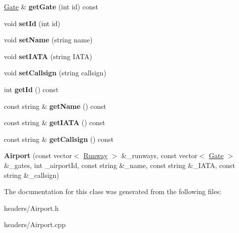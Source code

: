 \begin{DoxyCompactItemize}
\item 
\mbox{\label{class_airport_ac90a68c85cc0d7359bab8ca0d0ff8c0b}} 
\mbox{\hyperlink{class_gate}{Gate}} \& {\bfseries get\+Gate} (int id) const
\item 
\mbox{\label{class_airport_a3b8ef3abafb9f29b97acb73eb8014502}} 
void {\bfseries set\+Id} (int id)
\item 
\mbox{\label{class_airport_a064fd9435cd179b04d94c04a18a96583}} 
void {\bfseries set\+Name} (string name)
\item 
\mbox{\label{class_airport_a9555c51c003f8acb412e07442cb920c8}} 
void {\bfseries set\+I\+A\+TA} (string I\+A\+TA)
\item 
\mbox{\label{class_airport_a211a2877b1d654a9a50b28f260eec159}} 
void {\bfseries set\+Callsign} (string callsign)
\item 
\mbox{\label{class_airport_ab7f1095f9c7bf4940bd5b375fa8a5fc4}} 
int {\bfseries get\+Id} () const
\item 
\mbox{\label{class_airport_aa5be38443c1de176e52c4f5f5252c956}} 
const string \& {\bfseries get\+Name} () const
\item 
\mbox{\label{class_airport_aa127b88a8221fa23977c4fa6e37eee5b}} 
const string \& {\bfseries get\+I\+A\+TA} () const
\item 
\mbox{\label{class_airport_a7fd582a5f9554830247f724ddc031d84}} 
const string \& {\bfseries get\+Callsign} () const
\item 
\mbox{\label{class_airport_a7f47a952f374fd803abe6dca83a5755e}} 
{\bfseries Airport} (const vector$<$ \mbox{\hyperlink{class_runway}{Runway}} $>$ \&\+\_\+runways, const vector$<$ \mbox{\hyperlink{class_gate}{Gate}} $>$ \&\+\_\+gates, int \+\_\+airport\+Id, const string \&\+\_\+name, const string \&\+\_\+\+I\+A\+TA, const string \&\+\_\+callsign)
\end{DoxyCompactItemize}


The documentation for this class was generated from the following files\+:\begin{DoxyCompactItemize}
\item 
headers/Airport.\+h\item 
headers/Airport.\+cpp\end{DoxyCompactItemize}
